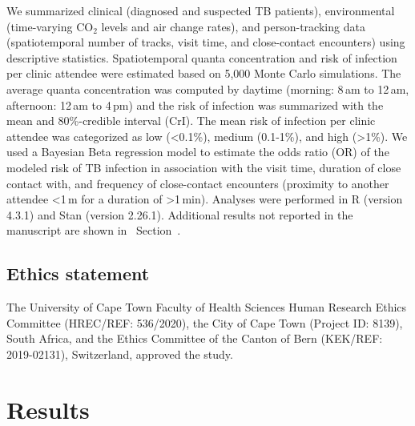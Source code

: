 \documentclass[fleqn,11pt]{wlscirep}
\begin{document}
We summarized clinical (diagnosed and suspected TB patients), environmental (time-varying CO$_2$ levels and air change rates), and person-tracking data (spatiotemporal number of tracks, visit time, and close-contact encounters) using descriptive statistics. Spatiotemporal quanta concentration and risk of infection per clinic attendee were estimated based on 5,000 Monte Carlo simulations. The average quanta concentration was computed by daytime (morning: 8\,am to 12\,am, afternoon: 12\,am to 4\,pm) and the risk of infection was summarized with the mean and 80\%-credible interval (CrI). The mean risk of infection per clinic attendee was categorized as low (<0.1\%), medium (0.1-1\%), and high (>1\%). We used a Bayesian Beta regression model to estimate the odds ratio (OR) of the modeled risk of TB infection in association with the visit time, duration of close contact with, and frequency of close-contact encounters (proximity to another attendee <1\,m for a duration of >1\,min). Analyses were performed in R (version 4.3.1) and Stan (version 2.26.1). Additional results not reported in the manuscript are shown in \supp~Section~. 

\subsection*{Ethics statement}

The University of Cape Town Faculty of Health Sciences Human Research Ethics Committee (HREC/REF: 536/2020), the City of Cape Town (Project ID: 8139), South Africa, and the Ethics Committee of the Canton of Bern (KEK/REF: 2019-02131), Switzerland, approved the study.

\newpage

\section*{Results}
\end{document}
